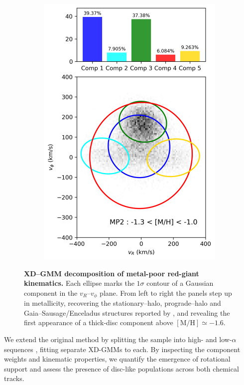 \documentclass[a4paper,10pt]{article}
\begin{document}
\begin{multicols}{2}
\begin{figure}[t]
\begin{subfigure}[t]{0.245\textwidth}
    \centering\includegraphics[width=\linewidth]{../figures/gmm_MP2.png}
  \end{subfigure}
  \caption{\textbf{XD–GMM decomposition of metal-poor red-giant kinematics.}
           Each ellipse marks the $1\sigma$ contour of a Gaussian component in
           the $v_R$–$v_\phi$ plane.  From left to right the panels step up in
           metallicity, recovering the stationary–halo, prograde–halo and
           Gaia–Sausage/Enceladus structures reported by
           \citet{zhang2024existencemetalpoordiscmilky}, and revealing the
           first appearance of a thick-disc component above
           $\mathrm{[M/H]}\simeq-1.6$.}
  \label{fig:gmm_repro_zhang}
\end{figure}


We extend the original method by splitting the sample into high- and low-$\alpha$ sequences \citep{Vis2024}, fitting separate 
XD-GMMs to each. By inspecting the component weights and kinematic properties, we quantify the emergence of rotational support 
and assess the presence of disc-like populations across both chemical tracks.


\end{multicols}
\end{document}
